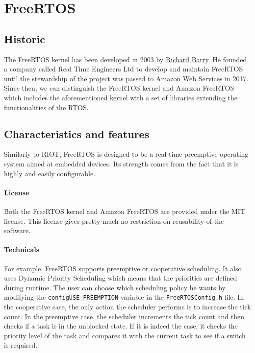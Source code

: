 \section{FreeRTOS}

\subsection{Historic}
The FreeRTOS kernel has been developed in 2003 by \href{https://www.linkedin.com/in/richard-barry-4562262/}{Richard Barry}. %
He founded a company called Real Time Engineers Ltd to develop and maintain FreeRTOS until the stewardship of the project was passed to Amazon Web Services in 2017.
Since then, we can distinguish the FreeRTOS kernel and Amazon FreeRTOS which includes the aforementioned kernel 
    with a set of libraries extending the functionalities of the RTOS.

\subsection{Characteristics and features}
Similarly to RIOT, FreeRTOS is designed to be a real-time preemptive operating system aimed at embedded devices.
Its strength comes from the fact that it is highly and easily configurable.\\

\paragraph{License} Both the FreeRTOS kernel and Amazon FreeRTOS are provided under the MIT license\cite{FreeRTOSlicense}.
This license gives pretty much no restriction on reusability of the software.

\paragraph{Technicals} For example, FreeRTOS supports preemptive or cooperative scheduling\cite{goyette}. 
It also uses Dynamic Priority Scheduling which means that the priorities are defined during runtime.
The user can choose which scheduling policy he wants by modifying the \texttt{configUSE\_PREEMPTION} variable in the \texttt{FreeRTOSConfig.h} file.
In the cooperative case, the only action the scheduler performs is to increase the tick count.
In the preemptive case, the scheduler increments the tick count and then checks if a task is in the unblocked state.
If it is indeed the case, it checks the priority level of the task and compares it with the current task to see if a switch is required.\\

